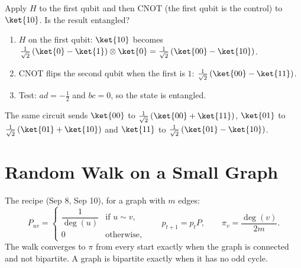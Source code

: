 \begin{exercisebox}
\begin{pproblem}\label{pp:circuit}
    Apply $H$ to the first qubit and then CNOT (the first qubit is the control) to $\ket{10}$. Is
    the result entangled?
\end{pproblem}
\tcblower
\begin{wsolution}
    \leavevmode
    \begin{enumerate}
        \item $H$ on the first qubit: $\ket{10}$ becomes
              $\frac{1}{\sqrt{2}}\left(\ket{0} - \ket{1}\right) \otimes \ket{0}
                  = \frac{1}{\sqrt{2}}\left(\ket{00} - \ket{10}\right)$.
        \item CNOT flips the second qubit when the first is $1$:
              $\frac{1}{\sqrt{2}}\left(\ket{00} - \ket{11}\right)$.
        \item Test: $ad = -\frac{1}{2}$ and $bc = 0$, so the state is entangled.
    \end{enumerate}
    The same circuit sends $\ket{00}$ to $\frac{1}{\sqrt{2}}\left(\ket{00} + \ket{11}\right)$,
    $\ket{01}$ to $\frac{1}{\sqrt{2}}\left(\ket{01} + \ket{10}\right)$ and $\ket{11}$ to
    $\frac{1}{\sqrt{2}}\left(\ket{01} - \ket{10}\right)$.
\end{wsolution}
\end{exercisebox}

\section{Random Walk on a Small Graph}\label{sec:walk}

The recipe (Sep 8, Sep 10), for a graph with $m$ edges:
\[P_{uv} = \begin{cases} \dfrac{1}{\deg(u)} & \text{if } u \sim v, \\[1ex] 0 & \text{otherwise,} \end{cases}
    \qquad
    p_{t+1} = p_t P,
    \qquad
    \pi_v = \frac{\deg(v)}{2m}.\]
The walk converges to $\pi$ from every start exactly when the graph is connected and not bipartite.
A graph is bipartite exactly when it has no odd cycle.


